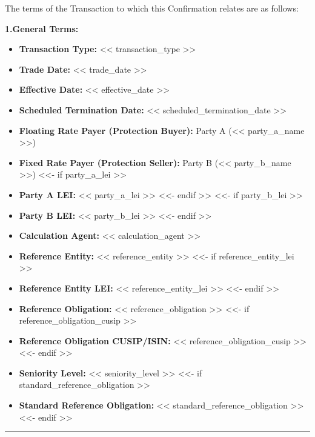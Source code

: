 \documentclass[11pt, a4paper]{article}
\begin{document}
\noindent The terms of the Transaction to which this Confirmation relates are as follows:

\vspace{0.3cm}


\noindent \textbf{1.\quad General Terms:}
\begin{itemize}[leftmargin=2cm, label={}, itemsep=3pt]
    \item \textbf{Transaction Type:} << transaction_type >>
    \item \textbf{Trade Date:} << trade_date >>
    \item \textbf{Effective Date:} << effective_date >>
    \item \textbf{Scheduled Termination Date:} << scheduled_termination_date >>
    \item \textbf{Floating Rate Payer (Protection Buyer):} Party A (<< party_a_name >>)
    \item \textbf{Fixed Rate Payer (Protection Seller):} Party B (<< party_b_name >>)
<<- if party_a_lei >>
    \item \textbf{Party A LEI:} << party_a_lei >>
<<- endif >>
<<- if party_b_lei >>
    \item \textbf{Party B LEI:} << party_b_lei >>
<<- endif >>
    \item \textbf{Calculation Agent:} << calculation_agent >>
    \item \textbf{Reference Entity:} << reference_entity >>
<<- if reference_entity_lei >>
    \item \textbf{Reference Entity LEI:} << reference_entity_lei >>
<<- endif >>
    \item \textbf{Reference Obligation:} << reference_obligation >>
<<- if reference_obligation_cusip >>
    \item \textbf{Reference Obligation CUSIP/ISIN:} << reference_obligation_cusip >>
<<- endif >>
    \item \textbf{Seniority Level:} << seniority_level >>
<<- if standard_reference_obligation >>
    \item \textbf{Standard Reference Obligation:} << standard_reference_obligation >>
<<- endif >>
\end{itemize}

\vspace{0.5cm}
\hrule
\vspace{0.5cm}
\end{document}
